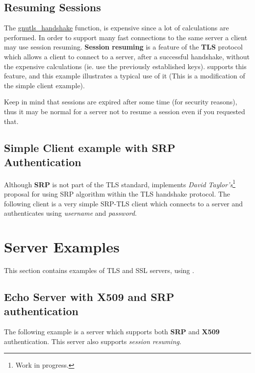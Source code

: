 \documentclass{book}
\begin{document}


\subsection{Resuming Sessions}
\par
The 
\hyperref{gnutls\_handshake()}{gnutls\_handshake() (see Section }{ for more information)}{gnutls_handshake}
 function, is expensive since
a lot of calculations are performed. In order to support many fast connections to
the same server a client may use session resuming. {\bf Session resuming} is a
feature of the {\bf TLS} protocol which allows a client to connect to a server,
after a successful handshake, without the expensive calculations (ie. use the previously
established keys). \gnutls supports this feature, and this example illustrates a
typical use of it (This is a modification of the simple client example).

\par
Keep in mind that sessions are expired after some time (for security reasons), thus
it may be normal for a server not to resume a session even if you requested that.



\subsection{Simple Client example with SRP Authentication}
Although {\bf SRP} is not part of the TLS standard, \gnutls implements
{\it David Taylor's}\footnote{Work in progress.} proposal for using SRP algorithm
within the TLS handshake protocol. The following client
is a very simple SRP-TLS client which connects to a server 
and authenticates using {\it username} and {\it password}.



\section{Server Examples}
This section contains examples of TLS and SSL servers, using \gnutls.

\subsection{Echo Server with X509 and SRP authentication}
The following example is a server which supports both {\bf SRP} and {\bf X509} authentication.
This server also supports {\it session resuming}.





\end{document}
